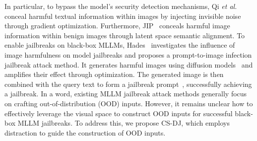 In particular, to bypass the model’s security detection mechanisms, Qi \textit{et al.}~\cite{qi2024visual} conceal harmful textual information within images by injecting invisible noise~\cite{zhou2023advclip} through gradient optimization. 
Furthermore, JIP~\cite{shayegani2023jailbreak} conceals harmful image information within benign images through latent space semantic alignment.
To enable jailbreaks on black-box MLLMs, Hades~\cite{li2024images} investigates the influence of image harmfulness on model jailbreaks and proposes a prompt-to-image infection jailbreak attack method. It generates harmful images using diffusion models~\cite{song2020denoising,yang2023diffusion,ma2024visual} and amplifies their effect through optimization. The generated image is then combined with the query text to form a jailbreak prompt~\cite{liu2023query,liu2024arondight,gong2023figstep}, successfully achieving a jailbreak. 
In a word, existing MLLM jailbreak attack methods generally focus on crafting out-of-distribution (OOD) inputs. However, it remains unclear how to effectively leverage the visual space to construct OOD inputs for successful black-box MLLM jailbreaks. To address this, we propose CS-DJ, which employs distraction to guide the construction of OOD inputs.




